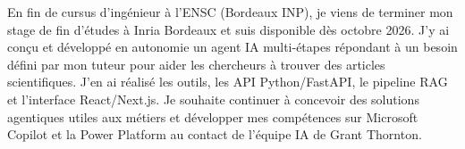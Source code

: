 
\begin{cvparagraph}
En fin de cursus d’ingénieur à l’ENSC (Bordeaux INP), je viens de terminer mon stage de fin d’études à Inria Bordeaux et suis disponible dès octobre 2026. J’y ai conçu et développé en autonomie un agent IA multi-étapes répondant à un besoin défini par mon tuteur pour aider les chercheurs à trouver des articles scientifiques. J’en ai réalisé les outils, les API Python/FastAPI, le pipeline RAG et l’interface React/Next.js. Je souhaite continuer à concevoir des solutions agentiques utiles aux métiers et développer mes compétences sur Microsoft Copilot et la Power Platform au contact de l’équipe IA de Grant Thornton.
\end{cvparagraph}
